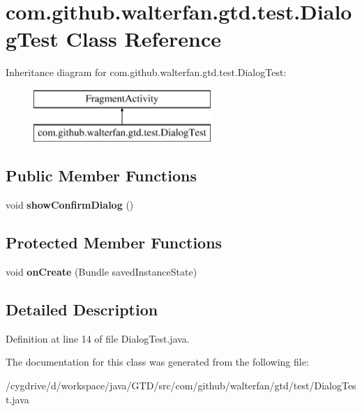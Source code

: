 \hypertarget{classcom_1_1github_1_1walterfan_1_1gtd_1_1test_1_1DialogTest}{\section{com.\-github.\-walterfan.\-gtd.\-test.\-Dialog\-Test Class Reference}
\label{classcom_1_1github_1_1walterfan_1_1gtd_1_1test_1_1DialogTest}
}
Inheritance diagram for com.\-github.\-walterfan.\-gtd.\-test.\-Dialog\-Test\-:\begin{figure}[H]
\begin{center}
\leavevmode
\includegraphics[height=2.000000cm]{classcom_1_1github_1_1walterfan_1_1gtd_1_1test_1_1DialogTest}
\end{center}
\end{figure}
\subsection*{Public Member Functions}
\begin{DoxyCompactItemize}
\item 
\hypertarget{classcom_1_1github_1_1walterfan_1_1gtd_1_1test_1_1DialogTest_ae3af60ec806b2496db140edd17b4d317}{void {\bfseries show\-Confirm\-Dialog} ()}\label{classcom_1_1github_1_1walterfan_1_1gtd_1_1test_1_1DialogTest_ae3af60ec806b2496db140edd17b4d317}

\end{DoxyCompactItemize}
\subsection*{Protected Member Functions}
\begin{DoxyCompactItemize}
\item 
\hypertarget{classcom_1_1github_1_1walterfan_1_1gtd_1_1test_1_1DialogTest_ae8c44d70382323681fc11fa5b65ad3c6}{void {\bfseries on\-Create} (Bundle saved\-Instance\-State)}\label{classcom_1_1github_1_1walterfan_1_1gtd_1_1test_1_1DialogTest_ae8c44d70382323681fc11fa5b65ad3c6}

\end{DoxyCompactItemize}


\subsection{Detailed Description}


Definition at line 14 of file Dialog\-Test.\-java.



The documentation for this class was generated from the following file\-:\begin{DoxyCompactItemize}
\item 
/cygdrive/d/workspace/java/\-G\-T\-D/src/com/github/walterfan/gtd/test/Dialog\-Test.\-java\end{DoxyCompactItemize}
